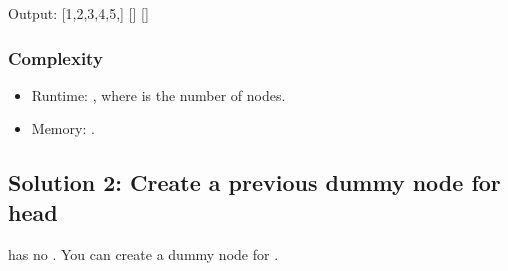 \documentclass[letterpaper,12pt,english]{book}
\begin{document}
\begin{sphinxVerbatim}[commandchars=\\\{\}]

\end{sphinxVerbatim}

\begin{sphinxVerbatim}[commandchars=\\\{\}]
Output:
[1,2,3,4,5,]
[]
[]
\end{sphinxVerbatim}


\subsubsection{Complexity}
\label{\detokenize{Linked_List/02_LL_203_Remove_Linked_List_Elements:complexity}}\begin{itemize}
\item {} 
\sphinxAtStartPar
Runtime: , where  is the number of nodes.

\item {} 
\sphinxAtStartPar
Memory: .

\end{itemize}


\subsection{Solution 2: Create a previous dummy node for head}
\label{\detokenize{Linked_List/02_LL_203_Remove_Linked_List_Elements:solution-2-create-a-previous-dummy-node-for-head}}
\sphinxAtStartPar
{} has no . You can create a dummy node for .
\end{document}
